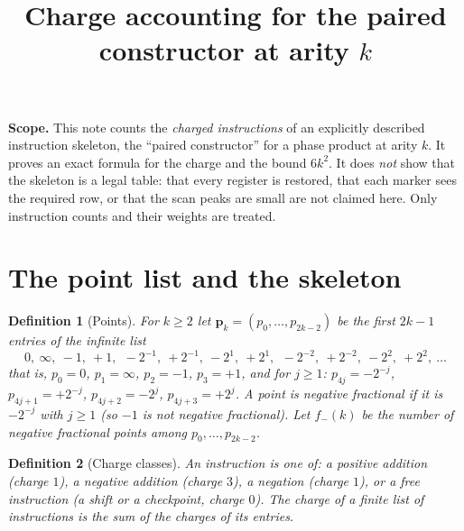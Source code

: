 \documentclass[11pt]{article}
\title{Charge accounting for the paired constructor at arity $k$}
\author{}
\date{}
\newtheorem{definition}{Definition}
\begin{document}
\maketitle

\noindent\textbf{Scope.} This note counts the \emph{charged instructions} of an explicitly described instruction skeleton, the ``paired constructor'' for a phase product at arity $k$. It proves an exact formula for the charge and the bound $6k^2$. It does \emph{not} show that the skeleton is a legal table: that every register is restored, that each marker sees the required row, or that the scan peaks are small are not claimed here. Only instruction counts and their weights are treated.

\section{The point list and the skeleton}

\begin{definition}[Points]
For $k\ge2$ let $\mathbf p_k=(p_0,\dots,p_{2k-2})$ be the first $2k-1$ entries of the infinite list
\[
0,\ \infty,\ -1,\ +1,\ \ -2^{-1},\ +2^{-1},\ -2^{1},\ +2^{1},\ \ -2^{-2},\ +2^{-2},\ -2^{2},\ +2^{2},\ \dots
\]
that is, $p_0=0$, $p_1=\infty$, $p_2=-1$, $p_3=+1$, and for $j\ge1$: $p_{4j}=-2^{-j}$, $p_{4j+1}=+2^{-j}$, $p_{4j+2}=-2^{j}$, $p_{4j+3}=+2^{j}$. A point is \emph{negative fractional} if it is $-2^{-j}$ with $j\ge1$ (so $-1$ is not negative fractional). Let $f_-(k)$ be the number of negative fractional points among $p_0,\dots,p_{2k-2}$.
\end{definition}

\begin{definition}[Charge classes]
An instruction is one of: a \emph{positive addition} (charge $1$), a \emph{negative addition} (charge $3$), a \emph{negation} (charge $1$), or a free instruction (a shift or a checkpoint, charge $0$). The charge of a finite list of instructions is the sum of the charges of its entries.
\end{definition}
\end{document}
